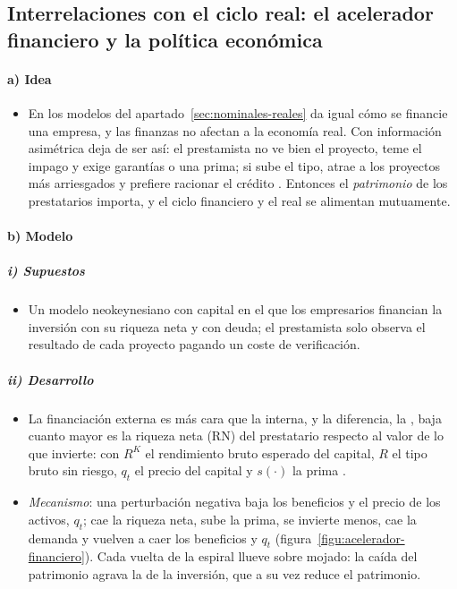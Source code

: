 \documentclass[11pt]{article}
\begin{document}
\subsection{Interrelaciones con el ciclo real: el acelerador financiero\cortetitulo{} y la política económica}\label{sec:cf-interrelaciones}

\paragraph{a) Idea}

\begin{itemize}
\item En los modelos del apartado~\ref{sec:nominales-reales} da igual cómo se financie una empresa, y las finanzas no afectan a la economía real. Con información asimétrica deja de ser así: el prestamista no ve bien el proyecto, teme el impago y exige garantías o una prima; si sube el tipo, atrae a los proyectos más arriesgados y prefiere racionar el crédito\nocite{StiglitzWeiss1981Credit} . Entonces el \emph{patrimonio} de los prestatarios importa, y el ciclo financiero y el real se alimentan mutuamente.
\end{itemize}

\paragraph{b) Modelo}

\subparagraph{i) Supuestos}

\begin{itemize}
\item Un modelo neokeynesiano con capital en el que los empresarios financian la inversión con su riqueza neta y con deuda; el prestamista solo observa el resultado de cada proyecto pagando un coste de verificación\nocite{BernankeGertler1989Agency,BernankeGertlerGilchrist1999}.
\end{itemize}

\subparagraph{ii) Desarrollo}

\begin{itemize}
\item La financiación externa es más cara que la interna, y la diferencia, la , baja cuanto mayor es la riqueza neta (RN) del prestatario respecto al valor de lo que invierte:
  con $R^K$ el rendimiento bruto esperado del capital, $R$ el tipo bruto sin riesgo, $q_t$ el precio del capital y $s(\cdot)$ la prima .
\item \emph{Mecanismo}: una perturbación negativa baja los beneficios y el precio de los activos, $q_t$; cae la riqueza neta, sube la prima, se invierte menos, cae la demanda y vuelven a caer los beneficios y $q_t$ (figura~\ref{figu:acelerador-financiero}). Cada vuelta de la espiral llueve sobre mojado: la caída del patrimonio agrava la de la inversión, que a su vez reduce el patrimonio.
\end{itemize}
\end{document}
